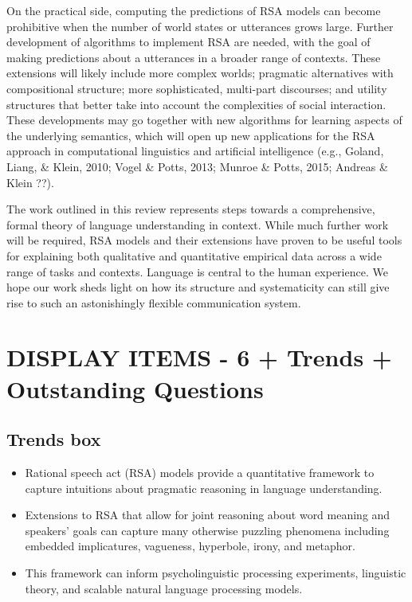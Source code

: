 \documentclass[]{elsarticle}
\begin{document}
On the practical side, computing the predictions of RSA models can
become prohibitive when the number of world states or utterances grows
large. Further development of algorithms to implement RSA are needed,
with the goal of making predictions about a utterances in a broader
range of contexts. These extensions will likely include more complex
worlds; pragmatic alternatives with compositional structure; more
sophisticated, multi-part discourses; and utility structures that better
take into account the complexities of social interaction. These
developments may go together with new algorithms for learning aspects of
the underlying semantics, which will open up new applications for the
RSA approach in computational linguistics and artificial intelligence
(e.g., Goland, Liang, \& Klein, 2010; Vogel \& Potts, 2013; Munroe \&
Potts, 2015; Andreas \& Klein ??).

The work outlined in this review represents steps towards a
comprehensive, formal theory of language understanding in context. While
much further work will be required, RSA models and their extensions have
proven to be useful tools for explaining both qualitative and
quantitative empirical data across a wide range of tasks and contexts.
Language is central to the human experience. We hope our work sheds
light on how its structure and systematicity can still give rise to such
an astonishingly flexible communication system.

\section{DISPLAY ITEMS - 6 + Trends + Outstanding
Questions}\label{display-items---6-trends-outstanding-questions}

\subsection{Trends box}\label{trends-box}

\begin{itemize}
\item
  Rational speech act (RSA) models provide a quantitative framework to
  capture intuitions about pragmatic reasoning in language
  understanding.
\item
  Extensions to RSA that allow for joint reasoning about word meaning
  and speakers' goals can capture many otherwise puzzling phenomena
  including embedded implicatures, vagueness, hyperbole, irony, and
  metaphor.
\item
  This framework can inform psycholinguistic processing experiments,
  linguistic theory, and scalable natural language processing models.
\end{itemize}
\end{document}
